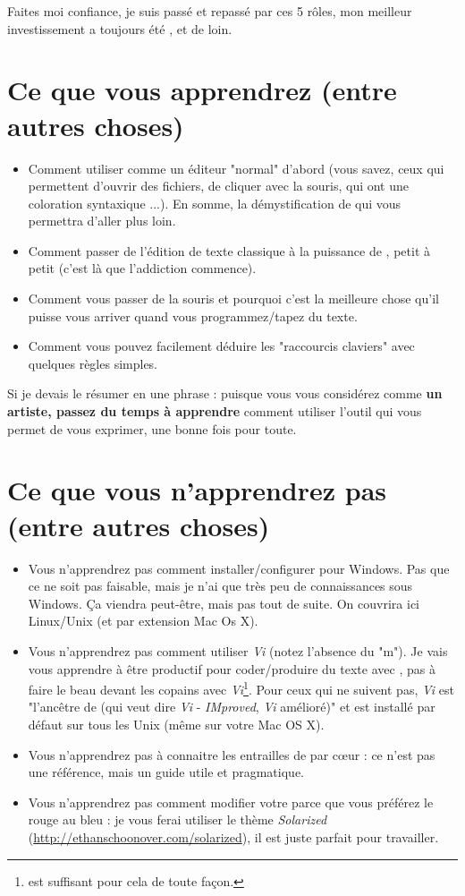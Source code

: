 Faites moi confiance, je suis passé et repassé par ces 5 rôles, mon meilleur investissement a toujours été \vim, et de loin.

\section{Ce que vous apprendrez (entre autres choses)}

\begin{itemize}
    \item Comment utiliser \vim comme un éditeur "normal" d'abord (vous savez, ceux qui permettent d'ouvrir des fichiers, de cliquer avec la souris, qui ont une coloration syntaxique ...). En somme, la démystification de \vim qui vous permettra d'aller plus loin.
    \item Comment passer de l'édition de texte classique à la puissance de \vim, petit à petit (c'est là que l'addiction commence).
    \item Comment vous passer de la souris et pourquoi c'est la meilleure chose qu'il puisse vous arriver quand vous programmez/tapez du texte.
    \item Comment vous pouvez facilement déduire les "raccourcis claviers" avec quelques règles simples.
\end{itemize}

Si je devais le résumer en une phrase : puisque vous vous considérez comme {\bf un artiste, passez du temps à apprendre} comment utiliser l'outil qui vous permet de vous exprimer, une bonne fois pour toute.

\section{Ce que vous n'apprendrez pas (entre autres choses)}

\begin{itemize}
    \item Vous n'apprendrez pas comment installer/configurer \vim pour Windows. Pas que ce ne soit pas faisable, mais je n'ai que très peu de connaissances sous Windows. Ça viendra peut-être, mais pas tout de suite. On couvrira ici Linux/Unix (et par extension Mac Os X).
    \item Vous n'apprendrez pas comment utiliser \emph{Vi} (notez l'absence du "m"). Je vais vous apprendre à être productif pour coder/produire du texte avec \vim, pas à faire le beau devant les copains avec \emph{Vi}\footnote{\vim est suffisant pour cela de toute façon.}. Pour ceux qui ne suivent pas, \emph{Vi} est "l'ancêtre de \vim (qui veut dire \emph{Vi} - \emph{IMproved}, \emph{Vi} amélioré)" et est installé par défaut sur tous les Unix (même sur votre Mac OS X).
    \item Vous n'apprendrez pas à connaitre les entrailles de \vim par c\oe ur : ce n'est pas une référence, mais un guide utile et pragmatique.
    \item Vous n'apprendrez pas comment modifier votre \vim parce que vous préférez le rouge au bleu : je vous ferai utiliser le thème \emph{Solarized} (\url{http://ethanschoonover.com/solarized}), il est juste parfait pour travailler.
\end{itemize}


